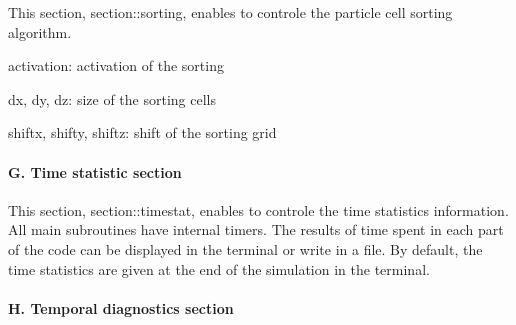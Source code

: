This section, {\ttfamily section\+::sorting}, enables to controle the particle cell sorting algorithm.


\begin{DoxyItemize}
\item {\ttfamily activation}\+: activation of the sorting
\item {\ttfamily dx}, {\ttfamily dy}, {\ttfamily dz}\+: size of the sorting cells
\item {\ttfamily shiftx}, {\ttfamily shifty}, {\ttfamily shiftz}\+: shift of the sorting grid
\end{DoxyItemize}

\paragraph*{G. Time statistic section}

This section, {\ttfamily section\+::timestat}, enables to controle the time statistics information. All main subroutines have internal timers. The results of time spent in each part of the code can be displayed in the terminal or write in a file. By default, the time statistics are given at the end of the simulation in the terminal.

\paragraph*{H. Temporal diagnostics section}